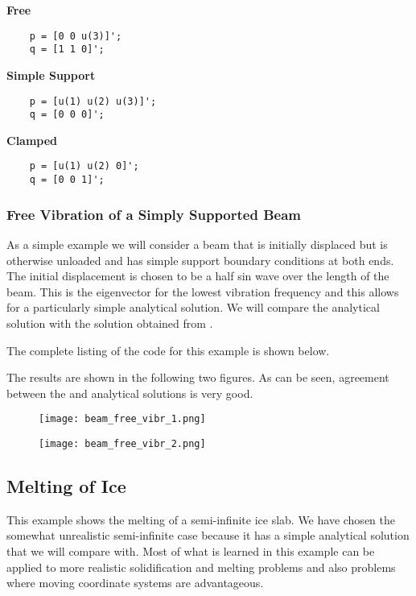 \documentclass{article}
\begin{document}
\bigskip
{\bf Free}
\begin{lstlisting}
	p = [0 0 u(3)]';
	q = [1 1 0]';
\end{lstlisting}

{\bf Simple Support}
\begin{lstlisting}
	p = [u(1) u(2) u(3)]';
	q = [0 0 0]';
\end{lstlisting}

{\bf Clamped}
\begin{lstlisting}
	p = [u(1) u(2) 0]';
	q = [0 0 1]';
\end{lstlisting}

\subsubsection{Free Vibration of a Simply Supported Beam}
As a simple example we will consider a beam that is initially displaced but
is otherwise unloaded and has simple support boundary conditions at both ends.
The initial displacement is chosen to be a half sin wave over the length of the
beam. This is the eigenvector for the lowest vibration frequency and this
allows for a particularly simple analytical solution. We will compare the
analytical solution with the solution obtained from \pde.

The complete listing of the \ml code for this example is shown below.

The results are shown in the following two figures. As can be seen, agreement
between the \pde and analytical solutions is very good.

\begin{figure}[!h]
	\centering
	\texttt{[image: beam\_free\_vibr\_1.png]}
	\label{fig:beam_free_vibr_1}
\end{figure} 
\begin{figure}[!h]
	\centering
	\texttt{[image: beam\_free\_vibr\_2.png]}
	\label{fig:beam_free_vibr_2}
\end{figure} 

\newpage
\subsection{Melting of Ice}
This example shows the melting of a semi-infinite ice slab. We have chosen the somewhat
unrealistic semi-infinite case because it has a simple analytical solution that we will
compare with. Most of what is learned in this example can be applied to more realistic
solidification and melting problems and also problems where moving coordinate systems are 
advantageous. 
\end{document}

